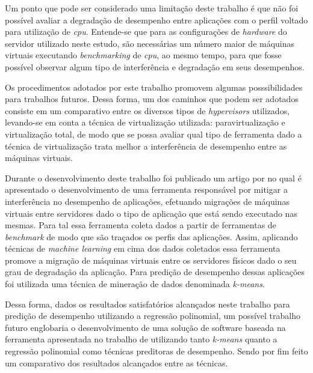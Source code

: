 Um ponto que pode ser considerado uma limitação deste trabalho é que não foi possível avaliar a degradação de desempenho entre aplicações com o perfil voltado para utilização de \textit{cpu}. Entende-se que para as configurações de \textit{hardware} do servidor utilizado neste estudo, são necessárias um número maior de máquinas virtuais executando \textit{benchmarking} de \textit{cpu}, ao mesmo tempo, para que fosse possível observar algum tipo de interferência e degradação em seus desempenhos.

Os procedimentos adotados por este trabalho promovem algumas posssibilidades para trabalhos futuros. Dessa forma, um dos caminhos que podem ser adotados consiste em um comparativo entre os diversos tipos de \textit{hypervisors} utilizados, levando-se em conta a técnica de virtualização utilizada: paravirtualização e virtualização total, de modo que se possa avaliar qual tipo de ferramenta dado a técnica de virtualização trata melhor a interferência de desempenho entre as máquinas virtuais.

 Durante o desenvolvimento deste trabalho foi publicado um artigo por  no qual é apresentado o desenvolvimento de uma ferramenta responsável por mitigar a interferência no desempenho de aplicações, efetuando migrações de máquinas virtuais entre servidores dado o tipo de aplicação que está sendo executado nas mesmas. Para tal essa ferramenta coleta dados a partir de ferramentas de \textit{benchmark} de modo que são traçados os perfis das aplicações. Assim, aplicando técnicas de \textit{machine learning} em cima dos dados coletados essa ferramenta promove a migração de máquinas virtuais entre os servidores físicos dado o seu grau de degradação da aplicação. Para predição de desempenho dessas aplicações foi utilizada uma técnica de mineração de dados denominada \textit{k-means}.
 

Dessa forma, dados os resultados satisfatórios alcançados neste trabalho para predição de desempenho utilizando a regressão polinomial, um possível trabalho futuro englobaria o desenvolvimento de uma solução de software baseada na ferramenta apresentada no trabalho de  utilizando tanto \textit{k-means} quanto a regressão polinomial como técnicas preditoras de desempenho. Sendo por fim feito um comparativo dos resultados alcançados entre as técnicas.


